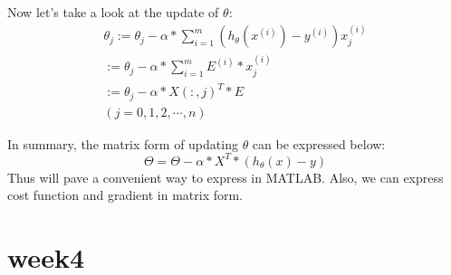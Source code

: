 \documentclass{article}
\begin{document}
Now let's take a look at the update of $\theta$:
\begin{eqnarray}
\theta_j := \theta_j - \alpha*\sum_{i=1}^{m}(h_\theta(x^{(i)})-y^{(i)})x_j^{(i)} \nonumber \\
:= \theta_j - \alpha * \sum_{i=1}^{m}E^{(i)}*x_j^{(i)} \nonumber\\
:= \theta_j - \alpha * X(:,j)^T * E \nonumber \\
(j = 0,1,2,\cdots,n)\nonumber
\end{eqnarray}

In summary, the matrix form of updating $\theta$ can be expressed below:
$$\Theta = \Theta - \alpha*X^T*(h_\theta(x)-y)$$
Thus will pave a convenient way to express in MATLAB. Also, we can express cost function and gradient in matrix form.

\section{week4}
\end{document}

